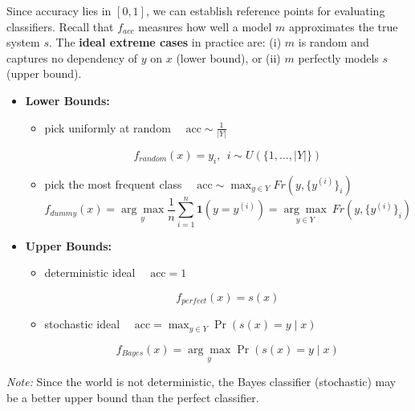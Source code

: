 \begin{exampleblock}
    
    Since accuracy lies in $[0, 1]$, we can establish reference points for evaluating classifiers. Recall that $f_{acc}$ measures how well a model $m$ approximates the true system $s$. The \textbf{ideal extreme cases} in practice are: (i) $m$ is random and captures no dependency of $y$ on $x$ (lower bound), or (ii) $m$ perfectly models $s$ (upper bound).

    \medskip

    \begin{itemize}
        \item \textbf{Lower Bounds:}
        \begin{itemize}[noitemsep]
            \item {} pick uniformly at random \hfill $\quad \text{acc} \sim \frac{1}{|Y|}$
            
            $$f_{random}(x) = y_i,\ \ i \sim U(\{1, \dots, |Y|\})$$

            \item {} pick the most frequent class \hfill $\quad \text{acc} \sim \max_{y \in Y} Fr(y, \{y^{(i)}\}_i)$
            $$f_{dummy}(x) = \underset{y}{\arg\max} \frac{1}{n} \sum_{i=1}^{n}\mathbf{1}(y = y^{(i)}) = \underset{y \in Y}{\arg\max}\ Fr(y, \{y^{(i)}\}_i)$$

        \end{itemize}
        \item \textbf{Upper Bounds:}
        \begin{itemize}[noitemsep]
            \item {} deterministic ideal \hfill $\quad \text{acc} = 1$
             
            $$f_{perfect}(x) = s(x)$$

            \item {} stochastic ideal \hfill $\quad \text{acc} = \max_{y \in Y} \Pr(s(x) = y \mid x)$
            
            $$f_{Bayes}(x) = \underset{y}{\arg\max} \Pr(s(x) = y \mid x)$$
        \end{itemize}
    \end{itemize}
    
    \smallskip
    \textit{Note:} Since the world is not deterministic, the Bayes classifier (stochastic) may be a better upper bound than the perfect classifier.
\end{exampleblock}

